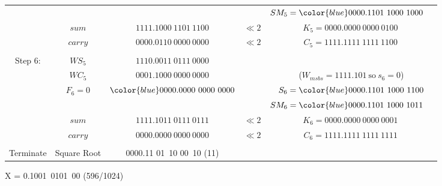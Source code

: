 \documentclass[12pt]{article}
\begin{document}
{\begin{center}
\begin{tabular}{ccccc}
            &                &                                   &          &$SM_5={\color{blue}0000.1101\ 1000\ 10}00\phantom{M}$\\
    \cline{2-3}
            &$sum           $&$         1111.1000\ 1101\ 1100   $&$\ll2    $&$K_5=0000.0000\ 0000\ 0100\ $\\
            &$carry         $&$         0000.0110\ 0000\ 0000   $&$\ll2    $&$C_5=1111.1111\ 1111\ 1100\,$\\
    \hdashline\\
    Step 6: &$WS_5          $&$         1110.0011\ 0111\ 0000   $&          &\\
            &$WC_5          $&$         0001.1000\ 0000\ 0000   $&          &($W_{msbs}=1111.101\ \text{so}\ s_6=0$)\\
            &$F_6=0        $&${\color{blue}0000.0000\ 0000\ 0000}$&         &$S_6={\color{blue}0000.1101\ 1000\ 1100}$\\
            &                &                                   &          &$SM_6={\color{blue}0000.1101\ 1000\ 1011}\phantom{M}$\\
    \cline{2-3}
            &$sum           $&$         1111.1011\ 0111\ 0111   $&$\ll2    $&$K_6=0000.0000\ 0000\ 0001\ $\\
            &$carry         $&$         0000.0000\ 0000\ 0000   $&$\ll2    $&$C_6=1111.1111\ 1111\ 1111\,$\\
    \hdashline\\
    Terminate&Square Root&0000.11 01\ 10 00\ 10 (11)
\end{tabular}
\end{center}
}

X = 0.1001\ 0101\ 00 (596/1024)
\end{document}
